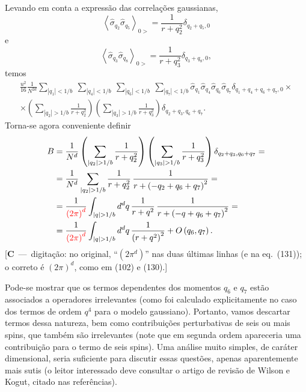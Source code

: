 \documentclass[12pt,a4paper]{article}
\newcommand{\sh}{\widehat{\sigma}}
\newcommand{\corr}[1]{\textcolor{red}{#1}}
\newcounter{corr}
\newcommand{\nota}[2]{\refstepcounter{corr}\label{#1}%
  {\color{red}\small[\textbf{C\thecorr}~---~#2]}}
\begin{document}
Levando em conta a expressão das correlações gaussianas,
\begin{equation}
\left\langle\sh_{q_2}\sh_{q_5}\right\rangle_{0>}=\frac{1}{r+q_2^2}\delta_{q_2+q_5,0}
\end{equation}
e
\begin{equation}
\left\langle\sh_{q_3}\sh_{q_8}\right\rangle_{0>}=\frac{1}{r+q_3^2}\delta_{q_3+q_8,0},
\end{equation}
temos
\begin{multline}
\frac{u^2}{16}\frac{1}{N^{2d}}\sum_{|q_1|<1/b}\ \sum_{|q_4|<1/b}\ \sum_{|q_6|<1/b}\ \sum_{|q_7|<1/b}\sh_{q_1}\sh_{q_4}\sh_{q_6}\sh_{q_7}\delta_{q_1+q_4+q_6+q_7,0}\times\\
\times\left(\sum_{|q_2|>1/b}\frac{1}{r+q_2^2}\right)\left(\sum_{|q_3|>1/b}\frac{1}{r+q_3^2}\right)\delta_{q_2+q_3,q_6+q_7}.
\end{multline}
Torna-se agora conveniente definir
\begin{equation}
\begin{split}
B&=\frac{1}{N^d}\left(\sum_{|q_2|>1/b}\frac{1}{r+q_2^2}\right)\left(\sum_{|q_3|>1/b}\frac{1}{r+q_3^2}\right)\delta_{q_2+q_3,q_6+q_7}=\\
&=\frac{1}{N^d}\sum_{|q_2|>1/b}\frac{1}{r+q_2^2}\,\frac{1}{r+\left(-q_2+q_6+q_7\right)^2}=\\
&=\frac{1}{\corr{\left(2\pi\right)^d}}\int_{|q|>1/b}d^dq\,\frac{1}{r+q^2}\,\frac{1}{r+\left(-q+q_6+q_7\right)^2}=\\
&=\frac{1}{\corr{\left(2\pi\right)^d}}\int_{|q|>1/b}d^dq\,\frac{1}{\left(r+q^2\right)^2}+O\left(q_6,q_7\right).
\end{split}
\end{equation}
\nota{c:2pi122}{digitação: no original, ``$(2\pi^d)$'' nas duas últimas linhas (e na eq.~(131));
o correto é $(2\pi)^d$, como em (102) e (130).}

Pode-se mostrar que os termos dependentes dos momentos $q_6$ e $q_7$ estão
associados a operadores irrelevantes (como foi calculado explicitamente no
caso dos termos de ordem $q^4$ para o modelo gaussiano). Portanto, vamos
descartar termos dessa natureza, bem como contribuições perturbativas de
seis ou mais spins, que também são irrelevantes (note que em segunda ordem
apareceria uma contribuição para o termo de seis spins). Uma análise muito
simples, de caráter dimensional, seria suficiente para discutir essas questões,
apenas aparentemente mais sutis (o leitor interessado deve consultar o artigo
de revisão de Wilson e Kogut, citado nas referências).
\end{document}

